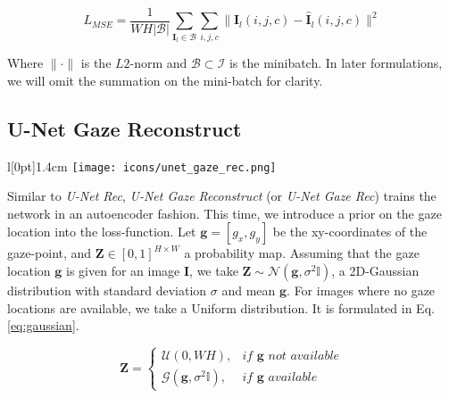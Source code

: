 \endgroup
\vspace{6pt}

\begin{equation}
L_{MSE} = \frac{1}{W H |\mathcal{B}|} \sum_{\boldsymbol{I}_l \in \mathcal{B}} \sum_{i,j,c} \|\boldsymbol{I}_l(i,j,c) - \boldsymbol{\hat{I}}_l(i,j,c)\|^2
\label{eq:mse_loss}
\end{equation}
\vspace{6pt}

Where $\| \cdot \|$ is the $L2$-norm and $\mathcal{B} \subset \mathcal{I}$ is the minibatch.
In later formulations, we will omit the summation on the mini-batch for clarity.

\clearpage
\subsection{U-Net Gaze Reconstruct} \label{unet_gaze_rec}
\begingroup
\setlength\intextsep{0pt}
\begin{wrapfigure}[4]{l}[0pt]{1.4cm}
\texttt{[image: icons/unet\_gaze\_rec.png]}
\end{wrapfigure}

Similar to \textit{U-Net Rec}, \textit{U-Net Gaze Reconstruct} (or \textit{U-Net Gaze Rec}) trains the network in an autoencoder fashion. This time, we introduce a prior on the gaze location into the loss-function. Let $\boldsymbol{g} = [g_x, g_y]$ be the xy-coordinates of the gaze-point, and  $\boldsymbol{Z} \in [0,1]^{H \times W}$ a probability map. Assuming that the gaze location $\boldsymbol{g}$ is given for an image $\boldsymbol{I}$, we take $\boldsymbol{Z} \sim \mathcal{N}(\boldsymbol{g}, \sigma^2\mathbb{I})$, a 2D-Gaussian distribution with standard deviation $\sigma$ and mean $\boldsymbol{g}$. For images where no gaze locations are available, we take a Uniform distribution. It is formulated in Eq. \ref{eq:gaussian}.

\endgroup

\begin{equation}
\boldsymbol{Z} = 
\begin{cases}
  \mathcal{U}(0,WH),& \textit{if } \boldsymbol{g} \textit{ not available}\\         \mathcal{G}(\boldsymbol{g}, \sigma^2\mathbb{I}),         & \textit{if } \boldsymbol{g} \textit{ available}
\end{cases}
\label{eq:gaussian}
\end{equation}
\hspace{6pt}

